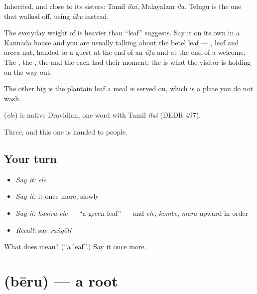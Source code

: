 Inherited, and close to its sisters: Tamil \emph{ilai}, Malayalam \emph{ila}. Telugu is the one that walked off, using \emph{āku} instead.

The everyday weight of  is heavier than \textquotedblleft{}leaf\textquotedblright{} suggests. Say it on its own in a Kannada house and you are usually talking about the betel leaf —  , leaf and areca nut, handed to a guest at the end of an \emph{ūṭa} and at the end of a welcome. The , the , the  and the  each had their moment; the  is what the visitor is holding on the way out.

The other big  is the plantain leaf a meal is served on, which is a plate you do not wash.

\begin{cousinweb}
\textbf{} (\emph{ele}) is native Dravidian, one word with Tamil \emph{ilai} (DEDR 497).
\end{cousinweb}

\begin{grammarlens}[title={What you've built}]
Three, and this one is handed to people.
\end{grammarlens}

\subsection*{Your turn}
\begin{itemize}
\raggedright
  \item \emph{Say it:} \emph{ele}
  \item \emph{Say it:} it once more, slowly
  \item \emph{Say it:} \emph{hasiru ele} — \textquotedblleft{}a green leaf\textquotedblright{} — and \emph{ele}, \emph{kombe}, \emph{mara} upward in order
  \item \emph{Recall:} say \emph{raṅgōli}
\end{itemize}

\begin{tcolorbox}[breakable,colback=teal!4,colframe=teal!35!black,title={Before you move on}]
What does  mean? (\textquotedblleft{}a leaf\textquotedblright{}.) Say it once more.
\end{tcolorbox}
\section[\texorpdfstring{\kn{ಬೇರು} (bēru)}{ಬೇರು (bēru)}]{ (bēru) — a root}

